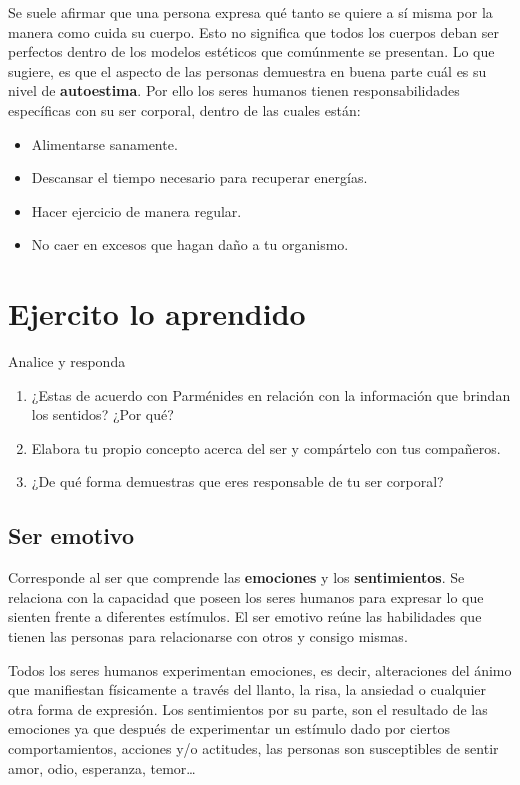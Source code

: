 \documentclass[twoside]{article}
\begin{document}
Se suele afirmar que una persona expresa qué tanto se
quiere a sí misma por la manera como cuida su cuerpo. Esto no significa que todos los cuerpos deban ser perfectos dentro de los modelos estéticos que comúnmente se presentan. Lo que sugiere, es que el aspecto de las personas demuestra en buena parte cuál es su nivel de \textbf{autoestima}. Por ello los seres humanos tienen responsabilidades específicas con su ser corporal, dentro de las cuales están:
\begin{itemize}
\item Alimentarse sanamente.
\item Descansar el tiempo necesario para recuperar energías. 
\item Hacer ejercicio de manera regular.
\item No caer en excesos que hagan daño a tu organismo.
\end{itemize}
\section*{Ejercito lo aprendido}
Analice y responda
\begin{enumerate}
\item ¿Estas de acuerdo con Parménides en relación
con la información que brindan los sentidos? ¿Por qué?
\item Elabora tu propio concepto acerca del ser y
compártelo con tus compañeros.
\item ¿De qué forma demuestras que eres responsable de tu ser corporal?
\end{enumerate}
\subsection*{Ser emotivo}
Corresponde al ser que comprende las \textbf{emociones} y los \textbf{sentimientos}. Se relaciona con la capacidad que poseen los seres humanos para expresar lo que sienten frente a diferentes estímulos. El ser emotivo reúne las habilidades que tienen las personas para relacionarse con otros y consigo mismas.

Todos los seres humanos experimentan emociones, es decir, alteraciones del ánimo que manifiestan físicamente a través del llanto, la risa, la ansiedad o cualquier otra forma de expresión. Los sentimientos por su parte, son el resultado de las emociones ya que después de experimentar un estímulo dado por ciertos comportamientos, acciones y/o actitudes, las personas son susceptibles de sentir amor, odio, esperanza, temor\ldots
\end{document}
